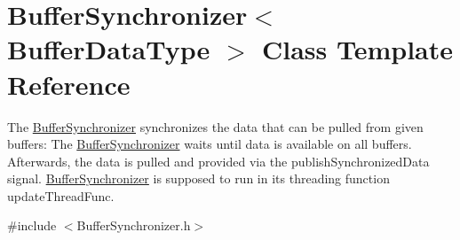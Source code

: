 \hypertarget{class_buffer_synchronizer}{}\section{Buffer\+Synchronizer$<$ Buffer\+Data\+Type $>$ Class Template Reference}
\label{class_buffer_synchronizer}


The \hyperlink{class_buffer_synchronizer}{Buffer\+Synchronizer} synchronizes the data that can be pulled from given buffers\+: The \hyperlink{class_buffer_synchronizer}{Buffer\+Synchronizer} waits until data is available on all buffers. Afterwards, the data is pulled and provided via the publish\+Synchronized\+Data signal. \hyperlink{class_buffer_synchronizer}{Buffer\+Synchronizer} is supposed to run in its threading function update\+Thread\+Func.  




{\ttfamily \#include $<$Buffer\+Synchronizer.\+h$>$}


